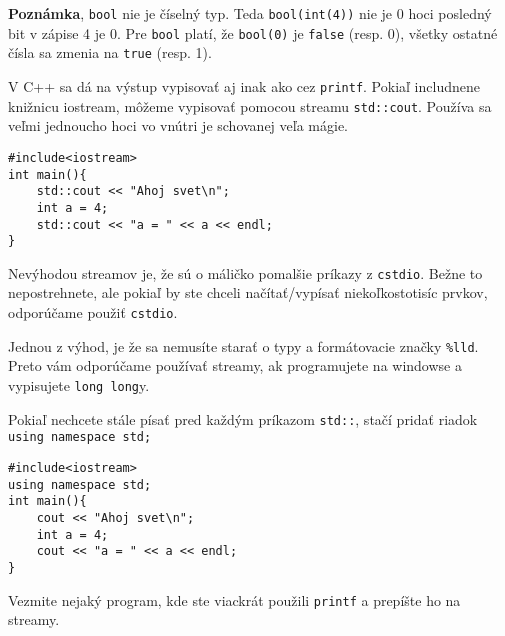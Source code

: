 \textbf{Poznámka}, \verb!bool! nie je číselný typ. Teda \verb!bool(int(4))! nie
je 0 hoci posledný bit v zápise 4 je 0.  Pre \verb!bool! platí, že
\verb!bool(0)! je \verb!false! (resp. 0), všetky ostatné čísla sa zmenia na
\verb!true! (resp. 1).


V C++ sa dá na výstup vypisovať aj inak ako cez \verb!printf!. Pokiaľ
includnene knižnicu iostream, môžeme vypisovať pomocou streamu
\verb!std::cout!. Používa sa veľmi jednoucho hoci vo vnútri je schovanej veľa
mágie.

\begin{lstlisting}
#include<iostream>
int main(){
    std::cout << "Ahoj svet\n";
    int a = 4;
    std::cout << "a = " << a << endl;
}
\end{lstlisting}

Nevýhodou streamov je, že sú o máličko pomalšie príkazy z \verb!cstdio!.  Bežne
to nepostrehnete, ale pokiaľ by ste chceli načítať/vypísať niekoľkostotisíc
prvkov, odporúčame použiť \verb!cstdio!.

Jednou z výhod, je že sa nemusíte starať o typy a formátovacie značky
\verb"%lld". Preto vám odporúčame používať streamy, ak programujete na windowse
a vypisujete \verb!long long!y.

Pokiaľ nechcete stále písať pred každým príkazom \verb!std::!, stačí pridať
riadok \verb!using namespace std;!

\begin{lstlisting}
#include<iostream>
using namespace std;
int main(){
    cout << "Ahoj svet\n";
    int a = 4;
    cout << "a = " << a << endl;
}
\end{lstlisting}

 Vezmite nejaký program, kde ste viackrát použili \verb!printf! a
prepíšte ho na streamy.




